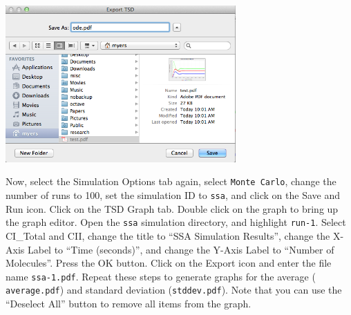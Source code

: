 \documentclass[titlepage,11pt]{article}
\begin{document}
\begin{center}
\includegraphics[height=60mm]{screenshots/exportTSD}
\end{center}

Now, select the Simulation Options tab again, select {\tt Monte Carlo}, change the number of runs to 100, set the simulation ID to {\tt ssa}, and click on the Save and Run icon.  Click on the TSD Graph tab.  Double click on the graph to bring up the graph editor.  Open the {\tt ssa} simulation directory, and highlight {\tt run-1}.
Select CI\_Total and CII, change the title to ``SSA Simulation Results'', change the X-Axis Label to ``Time (seconds)'', and change the Y-Axis Label to ``Number of Molecules''.  Press the OK button.  Click on the
Export icon and enter the file name {\tt ssa-1.pdf}.  Repeat these steps to generate graphs for the average ({\tt
  average.pdf}) and standard deviation ({\tt stddev.pdf}).  Note that you can use the ``Deselect All'' button to
remove all items from the graph.
\end{document}
